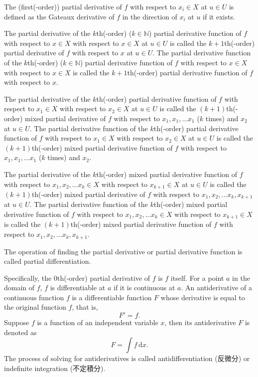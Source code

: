 \documentclass[a4paper,12pt]{report}
\begin{document}
The (first(-order)) partial derivative of $f$ with respect to $x_i\in X$ at $u\in U$ is defined as the Gateaux derivative of $f$ in the direction of $x_i$ at $u$ if it exists.

The partial derivative of the $k$th(-order) ($k\in\mathbb{N}$) partial derivative function of $f$ with respect to $ x \in X$ with respect to $ x \in X$ at $u\in U$ is called the $k+1$th(-order) partial derivative of $f$ with respect to $ x$ at $u\in U$. The partial derivative function of the $k$th(-order) ($k\in\mathbb{N}$) partial derivative function of $f$ with respect to $ x \in X$ with respect to $ x \in X$ is called the $k+1$th(-order) partial derivative function of $f$ with respect to $ x$.

The partial derivative of the $k$th(-order) partial derivative function of $f$ with respect to $ x_1\in X$ with respect to $ x_2\in X$ at $u\in U$ is called the $(k+1)$th(-order) mixed partial derivative of $f$ with respect to $ x_1, x_1,\ldots x_1$ ($k$ times) and $ x_2$ at $u\in U$. The partial derivative function of the $k$th(-order) partial derivative function of $f$ with respect to $ x_1\in X$ with respect to $ x_2\in X$ at $u\in U$ is called the $(k+1)$th(-order) mixed partial derivative function of $f$ with respect to $ x_1, x_1,\ldots x_1$ ($k$ times) and $ x_2$.

The partial derivative of the $k$th(-order) mixed partial derivative function of $f$ with respect to $ x_1, x_2,\ldots x_k\in X$ with respect to $ x_{k+1}\in X$ at $u\in U$ is called the $(k+1)$th(-order) mixed partial derivative of $f$ with respect to $ x_1, x_2,\ldots x_k, x_{k+1}$ at $u\in U$. The partial derivative function of the $k$th(-order) mixed partial derivative function of $f$ with respect to $ x_1, x_2,\ldots x_k\in X$ with respect to $ x_{k+1}\in X$ is called the $(k+1)$th(-order) mixed partial derivative function of $f$ with respect to $ x_1, x_2,\ldots x_k, x_{k+1}$.

The operation of finding the partial derivative or partial derivative function is called partial differentiation.

Specifically, the $0$th(-order) partial derivative of $f$ is $f$ itself.
For a point $a$ in the domain of $f$, $f$ is differentiable at $a$ if it is continuous at $a$.
An antiderivative of a continuous function $f$ is a differentiable function $F$ whose derivative is equal to the original function $f$, that is,
\[F'=f.\]
Suppose $f$ is a function of an independent variable $x$, then its antiderivative $F$ is denoted as
\[F=\int f\,\mathrm{d}x.\]
The process of solving for antiderivatives is called antidifferentiation (反微分) or indefinite integration (不定積分).
\end{document}
